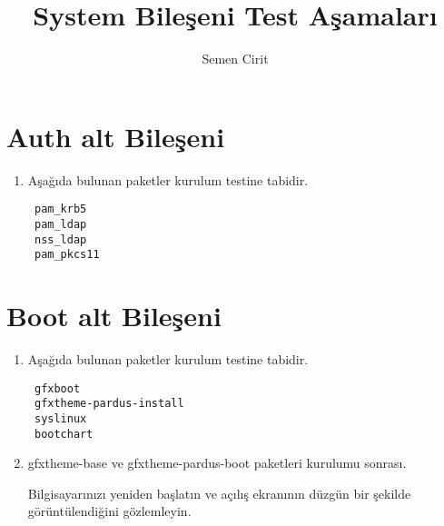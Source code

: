 \documentclass[a4paper,10pt]{article}
\title{System Bileşeni Test Aşamaları}
\author{Semen Cirit}
\begin{document}
\maketitle
\section{Auth alt Bileşeni}
\begin{enumerate}
  \item Aşağıda bulunan paketler kurulum testine tabidir.
\begin{verbatim}
 pam_krb5
 pam_ldap
 nss_ldap
 pam_pkcs11
\end{verbatim}

\end{enumerate}

\section{Boot alt Bileşeni}
\begin{enumerate}
 \item Aşağıda bulunan paketler kurulum testine tabidir.
\begin{verbatim}
 gfxboot
 gfxtheme-pardus-install
 syslinux
 bootchart
\end{verbatim}

\item gfxtheme-base ve gfxtheme-pardus-boot paketleri kurulumu sonrası.

Bilgisayarınızı yeniden başlatın ve açılış ekranının düzgün bir şekilde görüntülendiğini gözlemleyin.
\end{enumerate}
\end{document}
